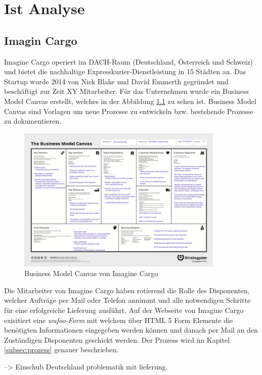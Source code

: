 \chapter{Ist Analyse}
\label{sec:istanalyse}
\section{Imagin Cargo}
Imagine Cargo operiert im DACH-Raum (Deutschland, Österreich und Schweiz) und bietet die nachhaltige Expresskurier-Dienstleistung in 15 Städten an. Das Startup wurde 2014 von Nick Blake und David Emmerth gegründet und beschäftigt zur Zeit XY Mitarbeiter. Für das Unternehmen wurde ein Business Model Canvas erstellt, welches in der Abbildung \ref{fig1:businessmodelcanvas} zu sehen ist. Business Model Canvas sind Vorlagen um neue Prozesse zu entwickeln bzw. bestehende Prozesse zu dokumentieren.
\begin{figure}[ht]
	\centering
  \includegraphics[width=0.88\textwidth]{images/businessModelCanvas.png}
	\caption{Business Model Canvas von Imagine Cargo}
	\label{fig1:businessmodelcanvas}
\end{figure}
 Die Mitarbeiter von Imagine Cargo haben rotierend die Rolle des Disponenten, welcher Aufträge per Mail oder Telefon annimmt und alle notwendigen Schritte für eine erfolgreiche Lieferung ausführt. Auf der Webseite von Imagine Cargo exisitiert eine \textit{wufoo-Form} mit welchem über HTML 5 Form Elemente die benötigten Informationen eingegeben werden können und danach per Mail an den Zuständigen Disponenten geschickt werden. Der Prozess wird im Kapitel \ref{subsec:prozess} genauer beschrieben.

--> Einschub Deutschland problematik mit lieferung.


